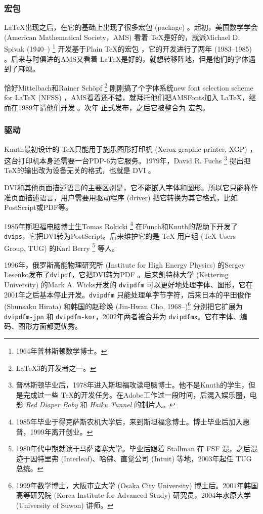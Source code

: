 \subsubsection{宏包}

\LaTeX 出现之后，在它的基础上出现了很多宏包 (package) 。起初，美国数学学会 (American Mathematical Society，AMS)\indexAMS{} 看着 \TeX 是好的，就派Michael D. Spivak (1940--)\indexSpivak{} \footnote{1964年普林斯顿数学博士。} 开发基于Plain \TeX 的宏包 \AmSTeX，它的开发进行了两年 (1983--1985) 。后来与时俱进的AMS又看着 \LaTeX 是好的，就想转移阵地，但是他们的字体遇到了麻烦。

恰好Mittelbach和Rainer Schöpf\indexSchopf{} \footnote{\LaTeX 3的开发者之一。} 刚刚搞了个字体系统new font selection scheme for \LaTeX{} (NFSS) ，AMS看着还不错，就拜托他们把AMSFonts加入 \LaTeX，继而在1989年请他们开发 \AmSLaTeX。次年 \AmSLaTeX 正式发布，之后它被整合为 \AmS 宏包。

\subsubsection{驱动}

Knuth最初设计的 \TeX 只能用于施乐图形打印机 (Xerox graphic printer, XGP) ，这台打印机本身还需要一台PDP-6为它服务。1979年，David R. Fuchs\indexFuchs{} \footnote{普林斯顿毕业后，1978年进入斯坦福攻读电脑博士。他不是Knuth的学生，但是完成过一些 \TeX 的开发任务。在Adobe工作过一段时间，后混入娱乐圈，电影 \emph{Red Diaper Baby} 和 \emph{Haiku Tunnel} 的制片人。} 提出把 \TeX 的输出改为设备无关的格式，也就是 DVI 。

DVI和其他页面描述语言的主要区别是，它不能嵌入字体和图形。所以它只能称作准页面描述语言，用户需要用驱动程序 (driver) 把它转换为其它格式，比如PostScript或PDF等。

1985年斯坦福电脑博士生Tomas Rokicki\indexRokicki{} \footnote{1985年毕业于得克萨斯农机大学后，来到斯坦福念博士。博士毕业后加入惠普，1999年离开创业。} 在Funch和Knuth的帮助下开发了\texttt{dvips}，它把DVI转为PostScript。后来维护它的是 TeX 用户组 (TeX Users Group, TUG)\indexTUG{} 的Karl Berry\indexBerry{} \footnote{1980年代中期就读于马萨诸塞大学。毕业后跟着 Stallman 在 FSF 混，之后混迹于因特里弗 (Interleaf)、哈佛、直觉公司 (Intuit) 等地，2003年起任 TUG 总统。} 等人。

1996年，俄罗斯高能物理研究所 (Institute for High Energy Physics) 的Sergey Lesenko\indexLesenko 发布了\texttt{dvipdf}，它把DVI转为PDF 。后来凯特林大学 (Kettering University) 的Mark A. Wicks\indexWicks 开发的 \texttt{dvipdfm} 可以更好地处理字体、图形，它在2001年之后基本停止开发。\texttt{dvipdfm} 只能处理单字节字符，后来日本的平田俊作 (Shunsaku Hirata)\indexHirata{} 和韩国的赵珍焕 (Jin-Hwan Cho, 1968--)\indexCho{}\footnote{1999年数学博士，大阪市立大学 (Osaka City University) 博士后。2001年韩国高等研究院 (Korea Institute for Advanced Study) 研究员，2004年水原大学 (University of Suwon) 讲师。} 分别把它扩展为 \texttt{dvipdfm-jpn} 和 \texttt{dvipdfm-kor}，2002年两者被合并为 \texttt{dvipdfmx}。它在字体、编码、图形方面都更优秀。

